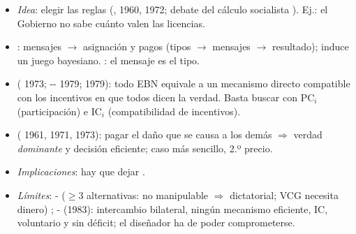 \documentclass{article}
\begin{document}
\begin{columnas}
\begin{itemize}
\item \emph{Idea}: elegir las reglas (, 1960, 1972; debate del cálculo socialista ). Ej.: el Gobierno no sabe cuánto valen las licencias.
\item {}: mensajes $\to$ asignación y pagos (tipos $\to$ mensajes $\to$ resultado); induce un juego bayesiano. : el mensaje es el tipo.
\item {} ( 1973; -- 1979;  1979): todo EBN equivale a un mecanismo directo compatible con los incentivos en que todos dicen la verdad. Basta buscar con $\mathrm{PC}_i$ (participación) e $\mathrm{IC}_i$ (compatibilidad de incentivos).
\item {} ( 1961,  1971,  1973): pagar el daño que se causa a los demás $\Rightarrow$ verdad \emph{dominante} y decisión eficiente; caso más sencillo, 2.º precio.
\item \emph{Implicaciones}: hay que dejar   .
\item \emph{Límites}: - ($\geq3$ alternativas: no manipulable $\Rightarrow$ dictatorial; VCG necesita dinero) ; - (1983): intercambio bilateral, ningún mecanismo eficiente, IC, voluntario y sin déficit; el diseñador ha de poder comprometerse.
\end{itemize}


\end{columnas}
\end{document}
